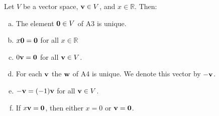 \documentclass[12pt,letterpaper,reqno]{article}
\numberwithin{equation}{section}
\begin{document}
\begin{thm}\label{thm:properties_of_vector_spaces}
	Let $V$ be a vector space, ${\bf v} \in V$, and $x \in \mathbb{R}$. Then:
	\begin{enumerate}[(a)]
		\item The element ${\bf 0} \in V$ of A3 is unique.
		\item $x{\bf 0}={\bf 0}$ for all $x\in \mathbb{R}$ 
		\item $0{\bf v}={\bf 0}$ for all ${\bf v} \in V$.
		\item For each ${\bf v}$ the ${\bf w}$ of A4 is unique. We denote this vector by $-{\bf v}$.
		\item $-{\bf v}=(-1){\bf v}$ for all ${\bf v} \in  V$.
		\item If $x{\bf v}={\bf 0}$, then either $x=0$ or ${\bf v}={\bf 0}$.
	\end{enumerate}
\end{thm}
\end{document}
